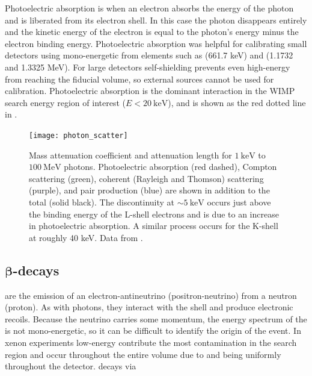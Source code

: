 Photoelectric absorption is when an electron absorbs the energy of the photon and is liberated from its electron shell.  In this case the
photon disappears entirely and the kinetic energy of the electron is equal to the photon's energy minus the electron binding
energy.  Photoelectric absorption was helpful for calibrating small detectors using mono-energetic \gammarays from elements such as
\cesium (661.7 keV) and \cobaltsixty
(1.1732 and 1.3325 MeV).  For large detectors self-shielding prevents even high-energy \gammarays from reaching the fiducial
volume, so external sources cannot be used for calibration.  Photoelectric absorption is the dominant interaction in the WIMP search
energy region of interest ($E < 20\ \mathrm{keV}$), and is shown as the red dotted line in .

\begin{figure}
 \centering
 \texttt{[image: photon\_scatter]}
 \caption[Mass attenuation coefficient and attenuation length for $1\ \mathrm{keV}$ to $100\ \mathrm{MeV}$ photons.  Photoelectric
 absorption, Compton scattering, coherent (Rayleigh and Thomson) scattering, and pair production are
 shown in addition to the total.]{Mass attenuation coefficient and attenuation length for $1\ \mathrm{keV}$ to
 $100\ \mathrm{MeV}$ photons.  Photoelectric
 absorption (red dashed), Compton scattering (green), coherent (Rayleigh and Thomson) scattering (purple), and pair production (blue) are
 shown in addition to the total (solid black).  The discontinuity at ${\sim}5\ \mathrm{keV}$ occurs just above the binding energy of the
 L-shell electrons and is due to an increase in photoelectric absorption.  A similar process occurs for the K-shell at
 roughly 40 keV.  Data from .}
 \label{fig:phot_atten}
\end{figure}


\subsection[$\beta$-decays][$\beta$-decays]{$\boldsymbol{\beta}$-decays}
\label{subsec:beta}
\betadecays are the emission of an electron-antineutrino (positron-neutrino) from a neutron (proton).  As with photons, they interact
with the \electron shell and produce electronic recoils.  Because the neutrino carries
some momentum, the energy spectrum of the \electron is not mono-energetic, so it can be difficult to identify the origin of the event.  In
xenon
experiments low-energy \betadecays contribute the most contamination in the search region and occur throughout the entire volume due to
 and  being uniformly throughout the detector.  \krypton decays via

